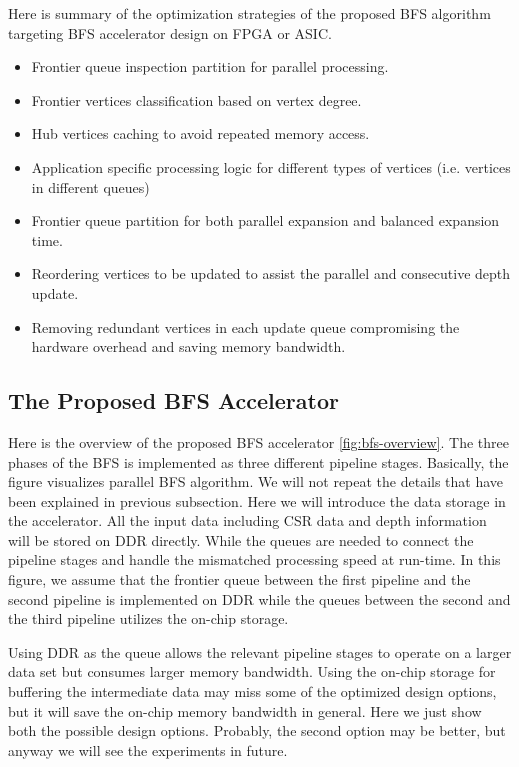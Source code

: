 \documentclass[12pt]{article} %
\begin{document}
Here is summary of the optimization strategies of the proposed BFS algorithm 
targeting BFS accelerator design on FPGA or ASIC.
\begin{itemize}
    \item Frontier queue inspection partition for parallel processing.
    \item Frontier vertices classification based on vertex degree.
    \item Hub vertices caching to avoid repeated memory access.
    \item Application specific processing logic for different types of 
        vertices (i.e. vertices in different queues)
    \item Frontier queue partition for both parallel expansion and balanced expansion time.
    \item Reordering vertices to be updated to assist the parallel and consecutive depth update.
    \item Removing redundant vertices in each update queue compromising the hardware 
        overhead and saving memory bandwidth.
\end{itemize}

\subsection{The Proposed BFS Accelerator}
Here is the overview of the proposed BFS accelerator \ref{fig:bfs-overview}. The three phases of the 
BFS is implemented as three different pipeline stages. Basically, the figure 
visualizes parallel BFS algorithm. We will not repeat the details that have been explained 
in previous subsection. Here we will introduce the data storage in the accelerator. 
All the input data including 
CSR data and depth information will be stored on DDR directly. While the queues are needed 
to connect the pipeline stages and handle the mismatched processing speed at run-time.
In this figure, we assume that the frontier queue between the first pipeline and the second 
pipeline is implemented on DDR while the queues between the second and the third pipeline 
utilizes the on-chip storage.

Using DDR as the queue allows the relevant pipeline stages to operate on a 
larger data set but consumes larger memory bandwidth. Using the on-chip storage 
for buffering the intermediate data may miss some of the optimized design options, 
but it will save the on-chip memory bandwidth in general. Here we just show both the possible 
design options. Probably, the second option may be better, but anyway we will see 
the experiments in future.  
\end{document}
